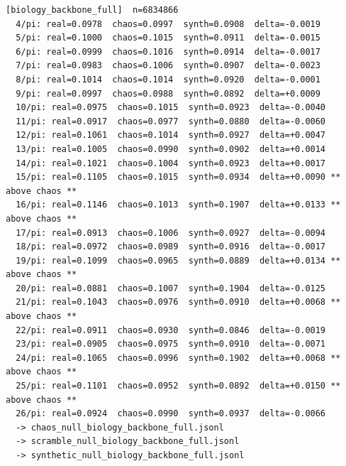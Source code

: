 \documentclass[11pt, letterpaper, openany]{book}
\begin{document}
\begin{empiricalbox}
\begin{lstlisting}[style=terminal]
[biology_backbone_full]  n=6834866
  4/pi: real=0.0978  chaos=0.0997  synth=0.0908  delta=-0.0019
  5/pi: real=0.1000  chaos=0.1015  synth=0.0911  delta=-0.0015
  6/pi: real=0.0999  chaos=0.1016  synth=0.0914  delta=-0.0017
  7/pi: real=0.0983  chaos=0.1006  synth=0.0907  delta=-0.0023
  8/pi: real=0.1014  chaos=0.1014  synth=0.0920  delta=-0.0001
  9/pi: real=0.0997  chaos=0.0988  synth=0.0892  delta=+0.0009
  10/pi: real=0.0975  chaos=0.1015  synth=0.0923  delta=-0.0040
  11/pi: real=0.0917  chaos=0.0977  synth=0.0880  delta=-0.0060
  12/pi: real=0.1061  chaos=0.1014  synth=0.0927  delta=+0.0047
  13/pi: real=0.1005  chaos=0.0990  synth=0.0902  delta=+0.0014
  14/pi: real=0.1021  chaos=0.1004  synth=0.0923  delta=+0.0017
  15/pi: real=0.1105  chaos=0.1015  synth=0.0934  delta=+0.0090 ** above chaos **
  16/pi: real=0.1146  chaos=0.1013  synth=0.1907  delta=+0.0133 ** above chaos **
  17/pi: real=0.0913  chaos=0.1006  synth=0.0927  delta=-0.0094
  18/pi: real=0.0972  chaos=0.0989  synth=0.0916  delta=-0.0017
  19/pi: real=0.1099  chaos=0.0965  synth=0.0889  delta=+0.0134 ** above chaos **
  20/pi: real=0.0881  chaos=0.1007  synth=0.1904  delta=-0.0125
  21/pi: real=0.1043  chaos=0.0976  synth=0.0910  delta=+0.0068 ** above chaos **
  22/pi: real=0.0911  chaos=0.0930  synth=0.0846  delta=-0.0019
  23/pi: real=0.0905  chaos=0.0975  synth=0.0910  delta=-0.0071
  24/pi: real=0.1065  chaos=0.0996  synth=0.1902  delta=+0.0068 ** above chaos **
  25/pi: real=0.1101  chaos=0.0952  synth=0.0892  delta=+0.0150 ** above chaos **
  26/pi: real=0.0924  chaos=0.0990  synth=0.0937  delta=-0.0066
  -> chaos_null_biology_backbone_full.jsonl
  -> scramble_null_biology_backbone_full.jsonl
  -> synthetic_null_biology_backbone_full.jsonl


\end{lstlisting}
\end{empiricalbox}
\end{document}
